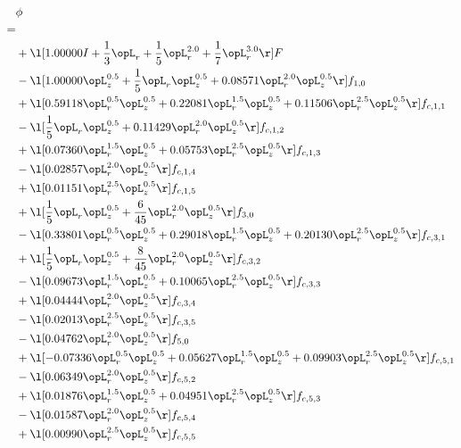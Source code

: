 \begin{alignat}{2} 
\label{eq:scalarFlux_0} 
& \phi \nonumber \\ 
 = \\ 
& + \l[  1.00000 I + \frac{1}{3} \opL_r + \frac{1}{5} \opL_r^{2.0} + \frac{1}{7} \opL_r^{3.0}  \r] F \nonumber \\ 
& - \l[  1.00000 \opL_z^{0.5} + \frac{1}{5} \opL_r \opL_z^{0.5} +  0.08571 \opL_r^{2.0} \opL_z^{0.5}  \r] f_{1,0} \nonumber \\ 
& + \l[  0.59118 \opL_r^{0.5} \opL_z^{0.5} +  0.22081 \opL_r^{1.5} \opL_z^{0.5} +  0.11506 \opL_r^{2.5} \opL_z^{0.5}  \r] f_{c,1,1} \nonumber \\ 
& - \l[ \frac{1}{5} \opL_r \opL_z^{0.5} +  0.11429 \opL_r^{2.0} \opL_z^{0.5}  \r] f_{c,1,2} \nonumber \\ 
& + \l[  0.07360 \opL_r^{1.5} \opL_z^{0.5} +  0.05753 \opL_r^{2.5} \opL_z^{0.5}  \r] f_{c,1,3} \nonumber \\ 
& - \l[  0.02857 \opL_r^{2.0} \opL_z^{0.5}  \r] f_{c,1,4} \nonumber \\ 
& + \l[  0.01151 \opL_r^{2.5} \opL_z^{0.5}  \r] f_{c,1,5} \nonumber \\ 
& + \l[ \frac{1}{5} \opL_r \opL_z^{0.5} + \frac{6}{45} \opL_r^{2.0} \opL_z^{0.5}  \r] f_{3,0} \nonumber \\ 
& - \l[  0.33801 \opL_r^{0.5} \opL_z^{0.5} +  0.29018 \opL_r^{1.5} \opL_z^{0.5} +  0.20130 \opL_r^{2.5} \opL_z^{0.5}  \r] f_{c,3,1} \nonumber \\ 
& + \l[ \frac{1}{5} \opL_r \opL_z^{0.5} + \frac{8}{45} \opL_r^{2.0} \opL_z^{0.5}  \r] f_{c,3,2} \nonumber \\ 
& - \l[  0.09673 \opL_r^{1.5} \opL_z^{0.5} +  0.10065 \opL_r^{2.5} \opL_z^{0.5}  \r] f_{c,3,3} \nonumber \\ 
& + \l[  0.04444 \opL_r^{2.0} \opL_z^{0.5}  \r] f_{c,3,4} \nonumber \\ 
& - \l[  0.02013 \opL_r^{2.5} \opL_z^{0.5}  \r] f_{c,3,5} \nonumber \\ 
& - \l[  0.04762 \opL_r^{2.0} \opL_z^{0.5}  \r] f_{5,0} \nonumber \\ 
& + \l[  -0.07336 \opL_r^{0.5} \opL_z^{0.5} +  0.05627 \opL_r^{1.5} \opL_z^{0.5} +  0.09903 \opL_r^{2.5} \opL_z^{0.5}  \r] f_{c,5,1} \nonumber \\ 
& - \l[  0.06349 \opL_r^{2.0} \opL_z^{0.5}  \r] f_{c,5,2} \nonumber \\ 
& + \l[  0.01876 \opL_r^{1.5} \opL_z^{0.5} +  0.04951 \opL_r^{2.5} \opL_z^{0.5}  \r] f_{c,5,3} \nonumber \\ 
& - \l[  0.01587 \opL_r^{2.0} \opL_z^{0.5}  \r] f_{c,5,4} \nonumber \\ 
& + \l[  0.00990 \opL_r^{2.5} \opL_z^{0.5}  \r] f_{c,5,5} \nonumber \\ 
\end{alignat} 


